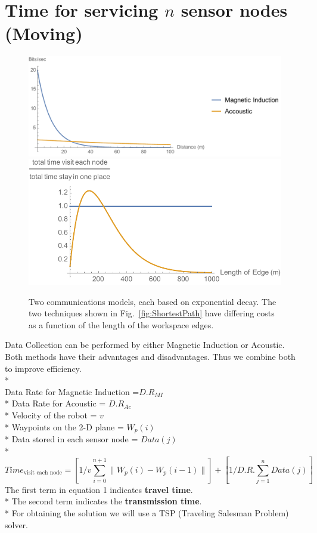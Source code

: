\documentclass{article}
\begin{document}
\section{Time for servicing $n$ sensor nodes (Moving)}
\begin{figure}[htb]
\begin{center}
	\includegraphics[width=0.48\columnwidth]{CommModel}
	\includegraphics[width=0.48\columnwidth]{CompareVisitEachToComm}
\end{center}
\caption{Two communications models, each based on exponential decay. The two techniques shown in Fig.\ \ref{fig:ShortestPath} have differing costs as a function of the length of the workspace edges.
\label{fig:CommModel}}
\end{figure}
 Data Collection can be performed by either Magnetic Induction or Acoustic. Both methods have their advantages and disadvantages. Thus we combine both to improve efficiency.\\*
\\
Data Rate for Magnetic Induction =$ D.R_{MI}$\\*
Data Rate for Acoustic = $D.R_{Ac}$\\*
Velocity of the robot = $v$\\*
Waypoints on the 2-D plane = $W_{p}(i)$\\*
Data stored in each sensor node = $Data(j)$\\*
\begin{equation}
    \label{equation_1}
   Time_{\textrm{visit each node}}  = [1/v \sum_{i=0}^{n+1} \|W_{p}(i)-W_{p}(i-1)\|] + [1/D.R. \sum_{j=1}^{n} Data(j)]    
\end{equation}
The first term in equation 1 indicates\textbf{ travel time}.\\*
The second term indicates the \textbf{transmission time}.\\*
For obtaining the solution we will use a TSP (Traveling Salesman Problem) solver.
\end{document}
